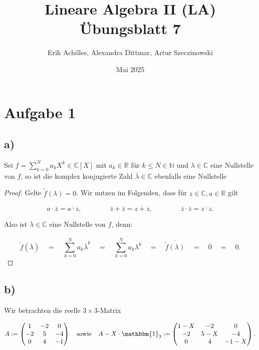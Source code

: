\documentclass{article}
\title{Lineare Algebra II (LA) Übungsblatt 7}
\author{Erik Achilles, Alexandra Dittmar, Artur Szeczinowski}
\date{Mai 2025}
\newcommand{\NN}{\mathbb{N}}
\newcommand{\RR}{\mathbb{R}}
\newcommand{\CC}{\mathbb{C}}
\newcommand{\eq}{\mathbb{\quad = \quad}}
\begin{document}

\section*{Aufgabe 1}
\subsection*{a)}

Sei $f = \sum_{k=0}^{N}a_kX^k\in \CC[X]$ mit
$a_k \in \RR$ für $k \leq N \in \NN$ und
$\lambda \in \CC$ eine Nullstelle von $f$, so ist die
komplex konjugierte Zahl $\overline{\lambda} \in \CC$
ebenfalls eine Nullstelle

\begin{proof}
  Gelte $\tilde{f}(\lambda) = 0$.
  Wir nutzen im Folgenden, dass für $z\in\CC,a\in\RR$ gilt

  \[
  a \cdot \overline{z} = \overline{a \cdot z},
  \qquad\qquad
  \overline{z} + \overline{z} = \overline{z + z},
  \qquad\qquad
  \overline{z} \cdot \overline{z} = \overline{z \cdot z}.
  \]

  Also ist $\overline{\lambda} \in \CC$ eine Nullstelle von $f$,
  denn:

  \[
  \tilde{f}(\overline{\lambda})
  \eq
  \sum_{k=0}^{N}a_k \overline{\lambda}^k
  \eq
  \overline{\sum_{k=0}^{N}a_k \lambda^k}
  \eq
  \overline{\tilde{f}(\lambda)}
  \eq
  \overline{0}
  \eq
  0.
  \]
\end{proof}

\subsection*{b)}

Wir betrachten die reelle $3 \times 3$-Matrix

\[
A := 
\begin{pmatrix}
1 & -2 & 0 \\
-2 & 5 & -4 \\
0 & 4 & -1
\end{pmatrix}
\quad \text{sowie} \quad
A - X \cdot \mathbbm{1}_3 := 
\begin{pmatrix}
1 - X & -2 & 0 \\
-2 & 5 - X & -4 \\
0 & 4 & -1 - X
\end{pmatrix}.
\]
\end{document}
